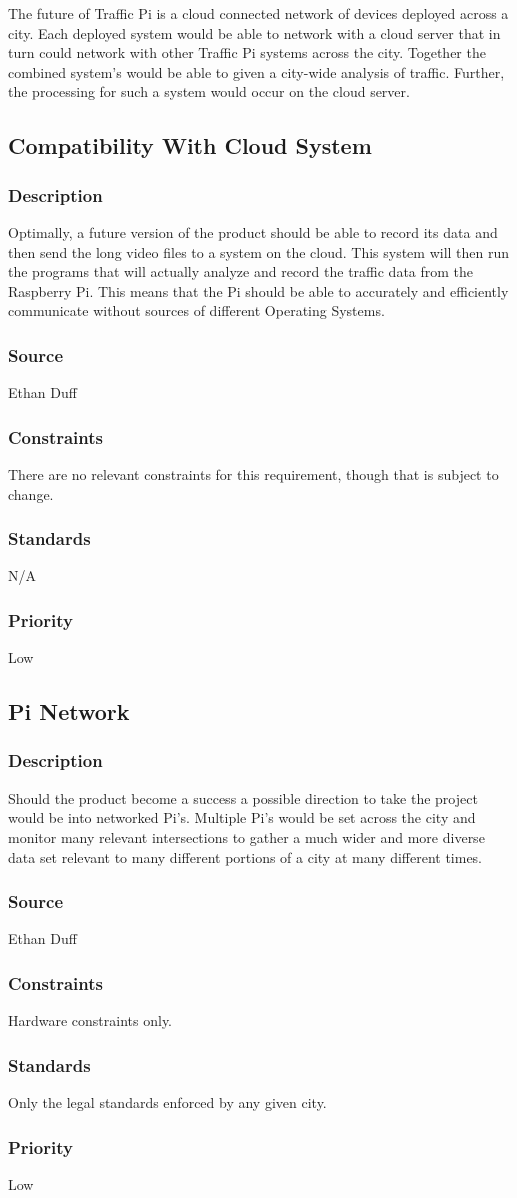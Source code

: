 The future of Traffic Pi is a cloud connected network of devices deployed across a city. Each deployed system would be able to network with a cloud server that in turn could network with other Traffic Pi systems across the city. Together the combined system's would be able to given a city-wide analysis of traffic. Further, the processing for such a system would occur on the cloud server.

\subsection{Compatibility With Cloud System}
\subsubsection{Description}
Optimally, a future version of the product should be able to record its data and then send the long video files to a system on the cloud.  This system will then run the programs that will actually analyze and record the traffic data from the Raspberry Pi.  This means that the Pi should be able to accurately and efficiently communicate without sources of different Operating Systems.
\subsubsection{Source}
Ethan Duff
\subsubsection{Constraints}
There are no relevant constraints for this requirement, though that is subject to change.
\subsubsection{Standards}
N/A
\subsubsection{Priority}
Low


\subsection{Pi Network}
\subsubsection{Description}
Should the product become a success a possible direction to take the project would be into networked Pi's.  Multiple Pi's would be set across the city and monitor many relevant intersections to gather a much wider and more diverse data set relevant to many different portions of a city at many different times.
\subsubsection{Source}
Ethan Duff
\subsubsection{Constraints}
Hardware constraints only.
\subsubsection{Standards}
Only the legal standards enforced by any given city.
\subsubsection{Priority}
Low